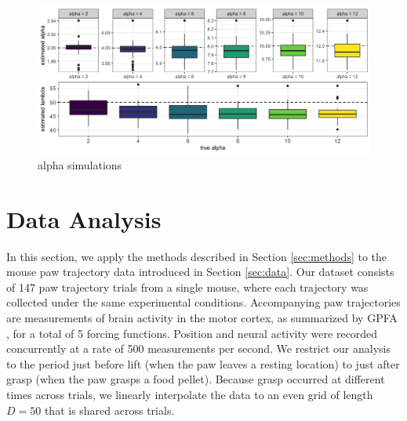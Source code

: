 \documentclass[preprint]{JASA}
\begin{document}
\begin{figure}
\includegraphics[width=\reprintcolumnwidth]{figs/fig_sim_alpha-1} \caption{alpha simulations}\label{fig:sim_alpha}
\end{figure}

\hypertarget{data-analysis}{%
\section{Data Analysis}\label{data-analysis}}

\label{sec:results}

In this section, we apply the methods described in Section
\ref{sec:methods} to the mouse paw trajectory data introduced in Section
\ref{sec:data}. Our dataset consists of 147 paw trajectory trials from a
single mouse, where each trajectory was collected under the same
experimental conditions. Accompanying paw trajectories are measurements
of brain activity in the motor cortex, as summarized by GPFA
\citep{yu2009}, for a total of 5 forcing functions. Position and neural
activity were recorded concurrently at a rate of 500 measurements per
second. We restrict our analysis to the period just before lift (when
the paw leaves a resting location) to just after grasp (when the paw
grasps a food pellet). Because grasp occurred at different times across
trials, we linearly interpolate the data to an even grid of length
\(D = 50\) that is shared across trials.
\end{document}
